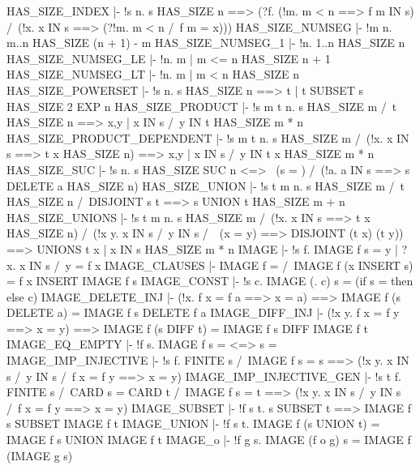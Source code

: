 \ENDTHEOREM
\THEOREM HAS\_SIZE\_INDEX
  |- !s n.
         s HAS_SIZE n
         ==> (?f. (!m. m < n ==> f m IN s) /\
                  (!x. x IN s ==> (?!m. m < n /\ f m = x)))
\ENDTHEOREM
\THEOREM HAS\_SIZE\_NUMSEG
  |- !m n. m..n HAS_SIZE (n + 1) - m
\ENDTHEOREM
\THEOREM HAS\_SIZE\_NUMSEG\_1
  |- !n. 1..n HAS_SIZE n
\ENDTHEOREM
\THEOREM HAS\_SIZE\_NUMSEG\_LE
  |- !n. {m | m <= n} HAS_SIZE n + 1
\ENDTHEOREM
\THEOREM HAS\_SIZE\_NUMSEG\_LT
  |- !n. {m | m < n} HAS_SIZE n
\ENDTHEOREM
\THEOREM HAS\_SIZE\_POWERSET
  |- !s n. s HAS_SIZE n ==> {t | t SUBSET s} HAS_SIZE 2 EXP n
\ENDTHEOREM
\THEOREM HAS\_SIZE\_PRODUCT
  |- !s m t n.
         s HAS_SIZE m /\ t HAS_SIZE n
         ==> {x,y | x IN s /\ y IN t} HAS_SIZE m * n
\ENDTHEOREM
\THEOREM HAS\_SIZE\_PRODUCT\_DEPENDENT
  |- !s m t n.
         s HAS_SIZE m /\ (!x. x IN s ==> t x HAS_SIZE n)
         ==> {x,y | x IN s /\ y IN t x} HAS_SIZE m * n
\ENDTHEOREM
\THEOREM HAS\_SIZE\_SUC
  |- !s n.
         s HAS_SIZE SUC n <=>
         ~(s = {}) /\ (!a. a IN s ==> s DELETE a HAS_SIZE n)
\ENDTHEOREM
\THEOREM HAS\_SIZE\_UNION
  |- !s t m n.
         s HAS_SIZE m /\ t HAS_SIZE n /\ DISJOINT s t
         ==> s UNION t HAS_SIZE m + n
\ENDTHEOREM
\THEOREM HAS\_SIZE\_UNIONS
  |- !s t m n.
         s HAS_SIZE m /\
         (!x. x IN s ==> t x HAS_SIZE n) /\
         (!x y. x IN s /\ y IN s /\ ~(x = y) ==> DISJOINT (t x) (t y))
         ==> UNIONS {t x | x IN s} HAS_SIZE m * n
\ENDTHEOREM
\THEOREM IMAGE
  |- !s f. IMAGE f s = {y | ?x. x IN s /\ y = f x}
\ENDTHEOREM
\THEOREM IMAGE\_CLAUSES
  |- IMAGE f {} = {} /\ IMAGE f (x INSERT s) = f x INSERT IMAGE f s
\ENDTHEOREM
\THEOREM IMAGE\_CONST
  |- !s c. IMAGE (\x. c) s = (if s = {} then {} else {c})
\ENDTHEOREM
\THEOREM IMAGE\_DELETE\_INJ
  |- (!x. f x = f a ==> x = a)
     ==> IMAGE f (s DELETE a) = IMAGE f s DELETE f a
\ENDTHEOREM
\THEOREM IMAGE\_DIFF\_INJ
  |- (!x y. f x = f y ==> x = y)
     ==> IMAGE f (s DIFF t) = IMAGE f s DIFF IMAGE f t
\ENDTHEOREM
\THEOREM IMAGE\_EQ\_EMPTY
  |- !f s. IMAGE f s = {} <=> s = {}
\ENDTHEOREM
\THEOREM IMAGE\_IMP\_INJECTIVE
  |- !s f.
         FINITE s /\ IMAGE f s = s
         ==> (!x y. x IN s /\ y IN s /\ f x = f y ==> x = y)
\ENDTHEOREM
\THEOREM IMAGE\_IMP\_INJECTIVE\_GEN
  |- !s t f.
         FINITE s /\ CARD s = CARD t /\ IMAGE f s = t
         ==> (!x y. x IN s /\ y IN s /\ f x = f y ==> x = y)
\ENDTHEOREM
\THEOREM IMAGE\_SUBSET
  |- !f s t. s SUBSET t ==> IMAGE f s SUBSET IMAGE f t
\ENDTHEOREM
\THEOREM IMAGE\_UNION
  |- !f s t. IMAGE f (s UNION t) = IMAGE f s UNION IMAGE f t
\ENDTHEOREM
\THEOREM IMAGE\_o
  |- !f g s. IMAGE (f o g) s = IMAGE f (IMAGE g s)
